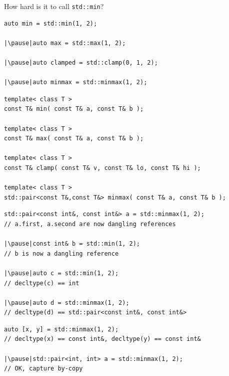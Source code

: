 \documentclass[aspectratio=169]{beamer}
\begin{document}
\begin{frame}[c]
\begin{center}
    \huge How hard is it to call \texttt{std::min}?
\end{center}
\end{frame}

\begin{frame}[fragile,c]
\begin{verbatim}
auto min = std::min(1, 2);

|\pause|auto max = std::max(1, 2);

|\pause|auto clamped = std::clamp(0, 1, 2);

|\pause|auto minmax = std::minmax(1, 2);
\end{verbatim}
\end{frame}

\begin{frame}[fragile]{}
\begin{small}
\begin{verbatim}
template< class T >
const T& min( const T& a, const T& b );

template< class T >
const T& max( const T& a, const T& b );

template< class T >
const T& clamp( const T& v, const T& lo, const T& hi );

template< class T >
std::pair<const T&,const T&> minmax( const T& a, const T& b );
\end{verbatim}
\end{small}
\end{frame}

\begin{frame}[fragile]{}
\begin{verbatim}
std::pair<const int&, const int&> a = std::minmax(1, 2);
// a.first, a.second are now dangling references

|\pause|const int& b = std::min(1, 2);
// b is now a dangling reference

|\pause|auto c = std::min(1, 2);
// decltype(c) == int

|\pause|auto d = std::minmax(1, 2);
// decltype(d) == std::pair<const int&, const int&>
\end{verbatim}
\end{frame}

\begin{frame}[fragile]{}
\begin{verbatim}
auto [x, y] = std::minmax(1, 2);
// decltype(x) == const int&, decltype(y) == const int&

|\pause|std::pair<int, int> a = std::minmax(1, 2);
// OK, capture by-copy
\end{verbatim}
\end{frame}
\end{document}
